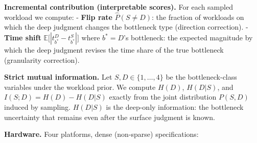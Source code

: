 \documentclass[11pt]{article}
\begin{document}
\textbf{Incremental contribution (interpretable scores).} For each sampled workload we compute: - \textbf{Flip rate} \(\hat{P}(S \neq D)\): the fraction of workloads on which the deep judgment changes the bottleneck type (direction correction). - \textbf{Time shift} \(\mathbb{E}\big[|t^D_{b^*} - t^S_{b^*}|\big]\) where \(b^* = D\)'s bottleneck: the expected magnitude by which the deep judgment revises the time share of the true bottleneck (granularity correction).

\textbf{Strict mutual information.} Let \(S, D \in \{1,\dots,4\}\) be the bottleneck-class variables under the workload prior. We compute \(H(D)\), \(H(D|S)\), and \(I(S;D) = H(D) - H(D|S)\) exactly from the joint distribution \(P(S,D)\) induced by sampling. \(H(D|S)\) is the deep-only information: the bottleneck uncertainty that remains even after the surface judgment is known.

\textbf{Hardware.} Four platforms, dense (non-sparse) specifications:
\end{document}
